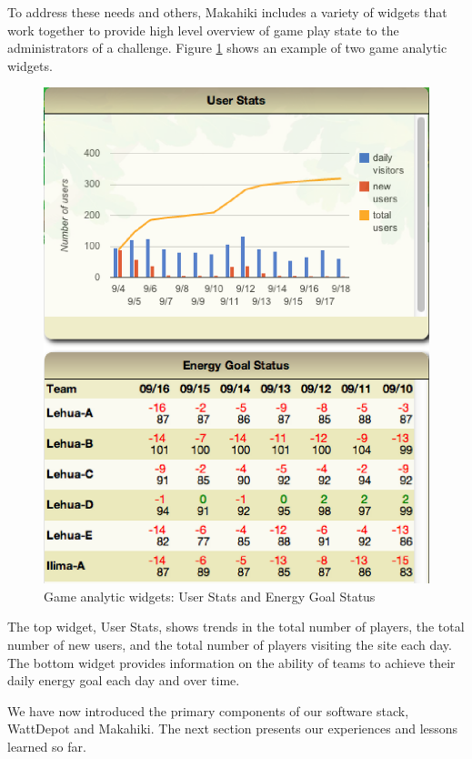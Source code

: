 To address these needs and others, Makahiki includes a variety of widgets that work together to provide high level overview of game play state to the administrators of a challenge. Figure \ref{fig:status} shows an example of two game analytic widgets.

\begin{figure}[t!]
  \center
  \includegraphics[width=0.95\columnwidth]{status.eps}
  \caption{Game analytic widgets: User Stats and Energy Goal Status}
  \label{fig:status}
\end{figure}

The top widget, User Stats, shows trends in the total number of players, the total number of new users, and the total number of players visiting the site each day.  The bottom widget provides information on the ability of teams to achieve their daily energy goal each day and over time.  

We have now introduced the primary components of our software stack, WattDepot and Makahiki.  The next section presents our experiences and lessons learned so far. 
